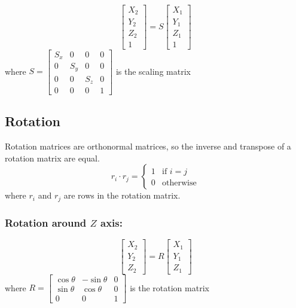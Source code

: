 \documentclass{article}
\begin{document}
\[\begin{bmatrix}
    X_2 \\ Y_2 \\ Z_2 \\ 1
\end{bmatrix} = S \begin{bmatrix}
    X_1 \\ Y_1 \\ Z_1 \\ 1
\end{bmatrix}\] where $S=\begin{bmatrix}
    S_x & 0 & 0 & 0 \\
    0 & S_y & 0 & 0 \\
    0 & 0 & S_z & 0 \\
    0 & 0 & 0 & 1
\end{bmatrix}$ is the scaling matrix

\subsection*{Rotation}
Rotation matrices are orthonormal matrices, so the inverse and transpose of a rotation matrix are equal.
\[r_i \cdot r_j = \begin{cases}
    1 & \text{if } i = j \\
    0 & \text{otherwise}
\end{cases}\] where $r_i$ and $r_j$ are rows in the rotation matrix.

\vspace{1em}

\subsubsection*{Rotation around $Z$ axis:}
\[\begin{bmatrix}
    X_2 \\ Y_2 \\ Z_2
\end{bmatrix} = R \begin{bmatrix}
    X_1 \\ Y_1 \\ Z_1
\end{bmatrix}\] where $R=\begin{bmatrix}
    \cos\theta & -\sin\theta & 0 \\
    \sin\theta & \cos\theta & 0 \\
    0 & 0 & 1
\end{bmatrix}$ is the rotation matrix
\end{document}
